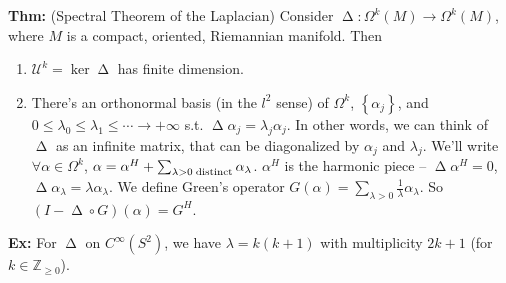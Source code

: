 \documentclass[10pt,letterpaper]{article}
\newcommand{\n}{\hfill\break}
\newcommand{\hangblock}[2]{\par\noindent\settowidth{\hangindent}{\textbf{#1: }}\textbf{#1: }\nolinebreak#2}
\newcommand{\thm}[1]{\hangblock{Thm}{#1}}
\newcommand{\ex}[1]{\hangblock{Ex}{#1}}
\newcommand{\ptxt}[1]{\textrm{\textnormal{#1}}}
\newcommand{\set}[1]{\left\{#1\right\}}
\newcommand{\integers}{\mathbb{Z}}
\newcommand{\Z}{\integers}
\DeclareMathOperator{\Laplacian}{\Delta}
\newcommand{\of}{\circ}
\newcommand{\st}{s.t.}
\newcommand{\mc}[1]{\mathcal{#1}}
\begin{document}
\thm{
	(Spectral Theorem of the Laplacian) Consider $\Laplacian:\Omega^{k}(M)\to\Omega^{k}(M)$, where $M$ is a compact, oriented, Riemannian manifold. Then
	\begin{enumerate}[label=(\arabic*), leftmargin=4\parindent]
		\item $\mc{U}^{k}=\ker\Laplacian$ has finite dimension.
		\item There's an orthonormal basis (in the $l^{2}$ sense) of $\Omega^{k}$, $\set{\alpha_{j}}$, and $0\le\lambda_{0}\le\lambda_{1}\le\cdots\to+\infty$ \st{} $\Laplacian\alpha_{j}=\lambda_{j}\alpha_{j}$. In other words, we can think of $\Laplacian$ as an infinite matrix, that can be diagonalized by $\alpha_{j}$ and $\lambda_{j}$. We'll write $\forall\alpha\in\Omega^{k}$, $\alpha=\alpha^{H}+\sum_{\lambda>0\;\ptxt{distinct}}\alpha_{\lambda}$. $\alpha^{H}$ is the harmonic piece -- $\Laplacian\alpha^{H}=0$, $\Laplacian\alpha_{\lambda}=\lambda\alpha_{\lambda}$. We define Green's operator $G(\alpha)=\sum_{\lambda>0}\frac{1}{\lambda}\alpha_{\lambda}$. So $(I-\Laplacian\of{}G)(\alpha)=G^{H}$.
	\end{enumerate}
}

\ex{
	For $\Laplacian$ on $C^{\infty}(S^{2})$, we have $\lambda=k(k+1)$ with multiplicity $2k+1$ (for $k\in\Z_{\ge{}0}$).\n
}
\end{document}
